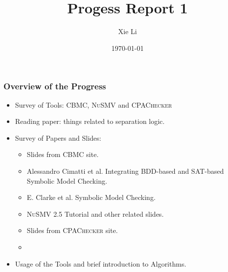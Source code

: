 \documentclass[11pt]{beamer}
\title{Progess Report 1}
\date{\today}
\author{Xie Li}
\begin{document}
\maketitle

\begin{frame}\frametitle{Overview of the Progress}
\begin{itemize}
\item Survey of Tools: \textsc{CBMC}, \textsc{NuSMV} and \textsc{CPAChecker}

\item Reading paper: things related to separation logic.
\item Survey of Papers and Slides:
\begin{itemize}
\item Slides from \textsc{CBMC} site.
\item Alessandro Cimatti et al. Integrating BDD-based and SAT-based Symbolic Model Checking.
\item E. Clarke et al. Symbolic Model Checking.
\item \textsc{NuSMV} 2.5 Tutorial and other related slides.
\item Slides from \textsc{CPAChecker} site.
\item 
\end{itemize}
\item Usage of the Tools and brief introduction to Algorithms.
\end{itemize}

\end{frame}
\end{document}

